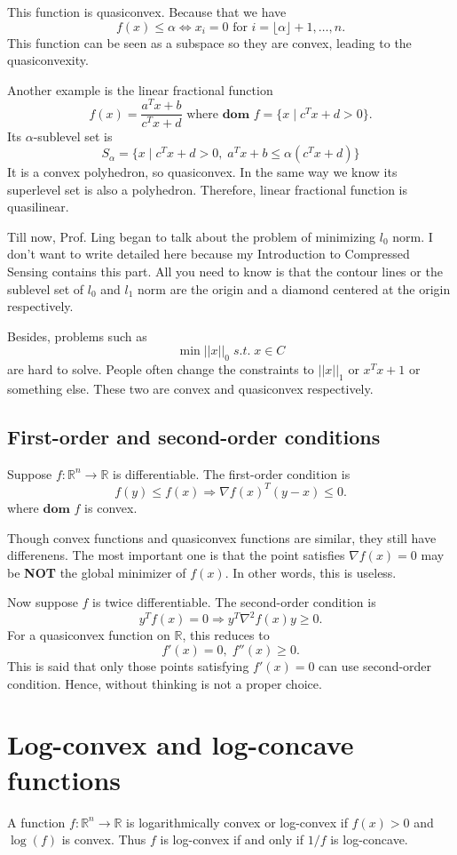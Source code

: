 \documentclass[lang=en,color=blue,mode=fancy,titlestyle=hang]{elegantbook}
\begin{document}
This function is quasiconvex. Because that we have
\[
f(x) \leq \alpha \Leftrightarrow x_i = 0 \text{ for } i = \lfloor \alpha \rfloor + 1, \ldots, n.
\]
This function can be seen as a subspace so they are convex, leading to the quasiconvexity.

Another example is the linear fractional function
\[
f(x) = \frac{a^{T}x + b}{c^{T}x + d} \text{ where } \textbf{dom } f = \{x \;|\; c^{T}x + d > 0\}.
\]
Its $\alpha$-sublevel set is
\[
S_{\alpha} = \{x \;|\; c^{T}x + d > 0, \; a^{T}x + b \leq \alpha (c^{T}x + d)\}
\]
It is a convex polyhedron, so quasiconvex. In the same way we know its superlevel set is
also a polyhedron. Therefore, linear fractional function is quasilinear.

Till now, Prof. Ling began to talk about the problem of minimizing $l_0$ norm. I don't
want to write detailed here because my Introduction to Compressed Sensing contains this
part. All you need to know is that the contour lines or the sublevel set of $l_0$ and
$l_1$ norm are the origin and a diamond centered at the origin respectively.

Besides, problems such as
\[
\min ||x||_0 \; s.t. \; x \in C
\]
are hard to solve. People often change the constraints to $||x||_1$ or $x^T x + 1$ or
something else. These two are convex and quasiconvex respectively.

\subsection{First-order and second-order conditions}
Suppose $f: \mathbb{R}^n \rightarrow \mathbb{R}$ is differentiable. The first-order
condition is
\[
f(y) \leq f(x) \Rightarrow \nabla f(x)^T (y - x) \leq 0.
\]
where $\textbf{dom } f$ is convex.

Though convex functions and quasiconvex functions are similar, they still have differenens.
The most important one is that the point satisfies $\nabla f(x) = 0$ may be \textbf{NOT}
the global minimizer of $f(x)$. In other words, this is useless.

Now suppose $f$ is twice differentiable. The second-order condition is
\[
y^T f(x) = 0 \Rightarrow y^T \nabla^2 f(x) y \geq 0.
\]
For a quasiconvex function on $\mathbb{R}$, this reduces to
\[
f'(x) = 0, \; f''(x) \geq 0.
\]
This is said that only those points satisfying $f'(x) = 0$ can use second-order condition.
Hence, without thinking is not a proper choice.

\section{Log-convex and log-concave functions}
A function $f: \mathbb{R}^n \rightarrow \mathbb{R}$ is logarithmically convex or log-convex
if $f(x) > 0$ and $\log(f)$ is convex. Thus $f$ is log-convex if and only if $1/f$ is
log-concave.
\end{document}
